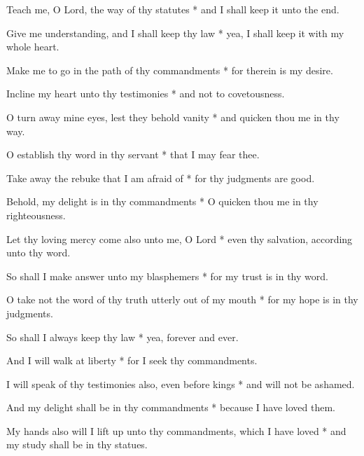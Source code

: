 Teach me, O Lord, the way of thy statutes * and I shall keep it unto the end.

Give me understanding, and I shall keep thy law * yea, I shall keep it with my whole heart.

Make me to go in the path of thy commandments * for therein is my desire.

Incline my heart unto thy testimonies * and not to covetousness.

O turn away mine eyes, lest they behold vanity * and quicken thou me in thy way.

O establish thy word in thy servant * that I may fear thee.

Take away the rebuke that I am afraid of * for thy judgments are good.

Behold, my delight is in thy commandments * O quicken thou me in thy righteousness.

Let thy loving mercy come also unto me, O Lord * even thy salvation, according unto thy word.

So shall I make answer unto my blasphemers * for my trust is in thy word.

O take not the word of thy truth utterly out of my mouth * for my hope is in thy judgments.

So shall I always keep thy law * yea, forever and ever.

And I will walk at liberty * for I seek thy commandments.

I will speak of thy testimonies also, even before kings * and will not be ashamed.

And my delight shall be in thy commandments * because I have loved them.

My hands also will I lift up unto thy commandments, which I have loved * and my study shall be in thy statues.
